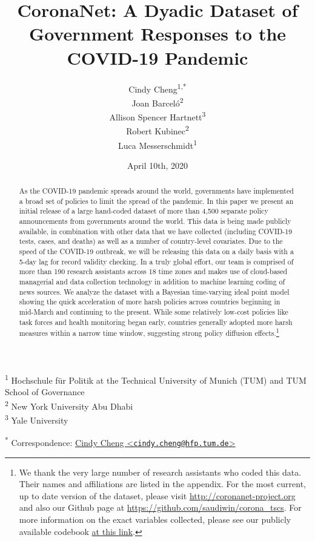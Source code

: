 \documentclass[]{article}
\title{CoronaNet: A Dyadic Dataset of Government Responses to the COVID-19 Pandemic}
\author{Cindy Cheng\textsuperscript{1,*} \\ Joan Barceló\textsuperscript{2} \\ Allison Spencer Hartnett\textsuperscript{3} \\ Robert Kubinec\textsuperscript{2} \\ Luca Messerschmidt\textsuperscript{1}}
\date{April 10th, 2020}
\let\rmarkdownfootnote\footnote%
\def\footnote{\protect\rmarkdownfootnote}
\begin{document}
\maketitle
\begin{abstract}
As the COVID-19 pandemic spreads around the world, governments have implemented a broad set of policies to limit the spread of the pandemic. In this paper we present an initial release of a large hand-coded dataset of more than 4,500 separate policy announcements from governments around the world. This data is being made publicly available, in combination with other data that we have collected (including COVID-19 tests, cases, and deaths) as well as a number of country-level covariates. Due to the speed of the COVID-19 outbreak, we will be releasing this data on a daily basis with a 5-day lag for record validity checking. In a truly global effort, our team is comprised of more than 190 research assistants across 18 time zones and makes use of cloud-based managerial and data collection technology in addition to machine learning coding of news sources. We analyze the dataset with a Bayesian time-varying ideal point model showing the quick acceleration of more harsh policies across countries beginning in mid-March and continuing to the present. While some relatively low-cost policies like task forces and health monitoring began early, countries generally adopted more harsh measures within a narrow time window, suggesting strong policy diffusion effects.\footnote{We thank the very large number of research assistants who coded this data. Their names and affiliations are listed in the appendix. For the most current, up to date version of the dataset, please visit \url{http://coronanet-project.org} and also our Github page at \url{https://github.com/saudiwin/corona_tscs}. For more information on the exact variables collected, please see our publicly available codebook \href{https://docs.google.com/document/d/1zvNMpwj0onFvUZ_gLl4RRjqS-clbHv3TIX6EOHofsME/edit?usp=sharing}{at this link}.}
\end{abstract}

\textsuperscript{1} Hochschule für Politik at the Technical University of Munich (TUM) and TUM School of Governance\\
\textsuperscript{2} New York University Abu Dhabi\\
\textsuperscript{3} Yale University

\textsuperscript{*} Correspondence: \href{mailto:cindy.cheng@hfp.tum.de}{Cindy Cheng \textless{}\href{mailto:cindy.cheng@hfp.tum.de}{\nolinkurl{cindy.cheng@hfp.tum.de}}\textgreater{}}
\end{document}
